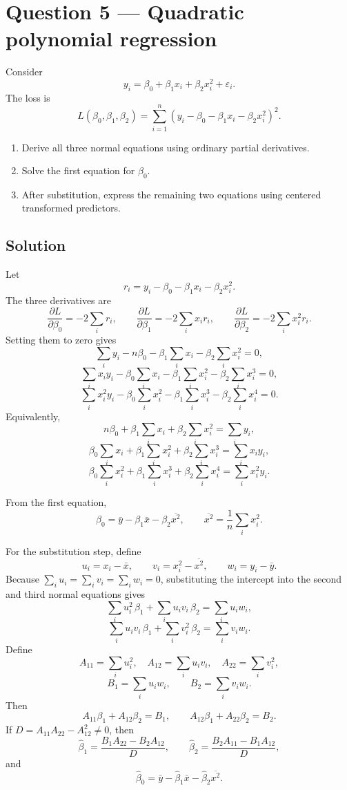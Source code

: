 ﻿\documentclass[11pt]{article}
\begin{document}
\newpage
\section*{Question 5 --- Quadratic polynomial regression}
Consider
\[
y_i=\beta_0+\beta_1x_i+\beta_2x_i^2+\varepsilon_i.
\]
The loss is
\[
L(\beta_0,\beta_1,\beta_2)
=\sum_{i=1}^n
\left(y_i-\beta_0-\beta_1x_i-\beta_2x_i^2\right)^2.
\]
\begin{enumerate}[label=(\alph*)]
\item Derive all three normal equations using ordinary partial derivatives.
\item Solve the first equation for $\beta_0$.
\item After substitution, express the remaining two equations using centered transformed predictors.
\end{enumerate}

\subsection*{Solution}
Let
\[
r_i=y_i-\beta_0-\beta_1x_i-\beta_2x_i^2.
\]
The three derivatives are
\[
\frac{\partial L}{\partial\beta_0}=-2\sum_i r_i,
\qquad
\frac{\partial L}{\partial\beta_1}=-2\sum_i x_ir_i,
\qquad
\frac{\partial L}{\partial\beta_2}=-2\sum_i x_i^2r_i.
\]
Setting them to zero gives
\[
\sum_i y_i-n\beta_0-\beta_1\sum_i x_i-\beta_2\sum_i x_i^2=0,
\]
\[
\sum_i x_iy_i-\beta_0\sum_i x_i-\beta_1\sum_i x_i^2-\beta_2\sum_i x_i^3=0,
\]
\[
\sum_i x_i^2y_i-\beta_0\sum_i x_i^2-\beta_1\sum_i x_i^3-\beta_2\sum_i x_i^4=0.
\]
Equivalently,
\[
\boxed{n\beta_0+\beta_1\sum_i x_i+\beta_2\sum_i x_i^2=\sum_i y_i},
\]
\[
\boxed{\beta_0\sum_i x_i+\beta_1\sum_i x_i^2+\beta_2\sum_i x_i^3=\sum_i x_iy_i},
\]
\[
\boxed{\beta_0\sum_i x_i^2+\beta_1\sum_i x_i^3+\beta_2\sum_i x_i^4=\sum_i x_i^2y_i}.
\]

From the first equation,
\[
\boxed{\beta_0=\bar y-\beta_1\bar x-\beta_2\overline{x^2}},
\qquad
\overline{x^2}=\frac1n\sum_i x_i^2.
\]

For the substitution step, define
\[
u_i=x_i-\bar x,
\qquad
v_i=x_i^2-\overline{x^2},
\qquad
w_i=y_i-\bar y.
\]
Because $\sum_i u_i=\sum_i v_i=\sum_i w_i=0$, substituting the intercept into the second and third normal equations gives
\[
\sum_i u_i^2\,\beta_1+\sum_i u_iv_i\,\beta_2=\sum_i u_iw_i,
\]
\[
\sum_i u_iv_i\,\beta_1+\sum_i v_i^2\,\beta_2=\sum_i v_iw_i.
\]
Define
\[
A_{11}=\sum_i u_i^2,\quad
A_{12}=\sum_i u_iv_i,\quad
A_{22}=\sum_i v_i^2,
\]
\[
B_1=\sum_i u_iw_i,\qquad B_2=\sum_i v_iw_i.
\]
Then
\[
A_{11}\beta_1+A_{12}\beta_2=B_1,
\qquad
A_{12}\beta_1+A_{22}\beta_2=B_2.
\]
If $D=A_{11}A_{22}-A_{12}^2\neq0$, then
\[
\boxed{\widehat\beta_1=\frac{B_1A_{22}-B_2A_{12}}{D}},
\qquad
\boxed{\widehat\beta_2=\frac{B_2A_{11}-B_1A_{12}}{D}},
\]
and
\[
\boxed{\widehat\beta_0=\bar y-\widehat\beta_1\bar x-\widehat\beta_2\overline{x^2}}.
\]
\end{document}
